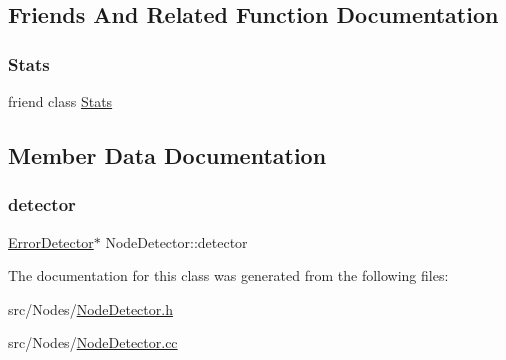 \subsection{Friends And Related Function Documentation}
\mbox{\label{classNodeDetector_a129f65b6976377739eb6231b6962985e}} 
\subsubsection{\texorpdfstring{Stats}{Stats}}
{\footnotesize\ttfamily friend class \hyperlink{classStats}{Stats}\hspace{0.3cm}{\ttfamily [friend]}}



\subsection{Member Data Documentation}
\mbox{\label{classNodeDetector_a711fd643dc29b74e6dfe87e1aeb1b227}} 
\subsubsection{\texorpdfstring{detector}{detector}}
{\footnotesize\ttfamily \hyperlink{classErrorDetector}{Error\+Detector}$\ast$ Node\+Detector\+::detector\hspace{0.3cm}{\ttfamily [protected]}}



The documentation for this class was generated from the following files\+:\begin{DoxyCompactItemize}
\item 
src/\+Nodes/\hyperlink{NodeDetector_8h}{Node\+Detector.\+h}\item 
src/\+Nodes/\hyperlink{NodeDetector_8cc}{Node\+Detector.\+cc}\end{DoxyCompactItemize}
